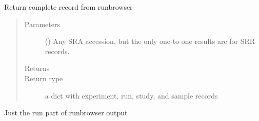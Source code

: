 \documentclass[letterpaper,10pt,english]{sphinxmanual}
\begin{document}
\begin{fulllineitems}
\label{\detokenize{omicidx.sra_parsers:omicidx.sra_parsers.results_from_runbrowser}}
Return complete record from runbrowser
\begin{quote}\begin{description}
\item[{Parameters}] \leavevmode
{} () \textendash{} Any SRA accession, but the only one-to-one results are
for SRR records.

\item[{Returns}] \leavevmode


\item[{Return type}] \leavevmode
a dict with experiment, run, study, and sample records

\end{description}\end{quote}

\end{fulllineitems}


\begin{fulllineitems}
\label{\detokenize{omicidx.sra_parsers:omicidx.sra_parsers.run_from_runbrowser}}
Just the run part of runbrowser output

\end{fulllineitems}


\begin{fulllineitems}
\label{\detokenize{omicidx.sra_parsers:omicidx.sra_parsers.run_iterator}}
\end{fulllineitems}
\end{document}

